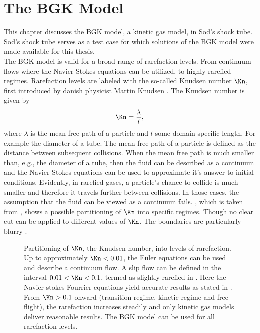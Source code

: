 

\chapter{The BGK Model}
\label{Ch:BGK}

This chapter discusses the BGK model, a kinetic gas model, in Sod's shock tube. Sod's shock tube serves as a test case for which solutions of the BGK model were made available for this thesis.\\
The BGK model is valid for a broad range of rarefaction levels. From continuum flows where the Navier-Stokes equations can be utilized, to highly rarefied regimes. Rarefaction levels are labeled with the so-called Knudsen number \(\Kn\), first introduced by danish physicist Martin Knudsen \cite{Bernard}. The Knudsen number is given by
\begin{equation}
	\Kn = \frac{\lambda}{l}, 
\end{equation}
where \(\lambda\) is the mean free path of a particle and \(l\) some domain specific length. For example the diameter of a tube. The mean free path of a particle is defined as the distance between subsequent collisions. When the mean free path is much smaller than, e.g., the diameter of a tube, then the fluid can be described as a continuum and the Navier-Stokes equations can be used to approximate it's answer to initial conditions. Evidently, in rarefied gases, a particle's chance to collide is much smaller and therefore it travels further between collisions. In those cases, the assumption that the fluid can be viewed as a continuum fails. , which is taken from \cite{NumaKUL}, shows a possible partitioning of \(\Kn\) into specific regimes. Though no clear cut can be applied to different values of \(\Kn\). The boundaries are particularly blurry \cite{schaaf}.
\begin{figure}[H]
	
	\caption{Partitioning of \(\Kn\), the Knudsen number, into levels of rarefaction. Up to approximately \(\Kn < 0.01\), the Euler equations can be used and describe a continuum flow. A slip flow can be defined in the interval \(0.01 < \Kn < 0.1\), termed as slightly rarefied in \cite{schaaf}. Here the Navier-stokes-Fourrier equations yield accurate results as stated in \cite{NumaKUL}. From \(\Kn > 0.1\) onward (transition regime, kinetic regime and free flight), the rarefaction increases steadily and only kinetic gas models deliver reasonable results. The BGK model can be used for all rarefaction levels.}
	\label{Fig:ExpKN}
\end{figure}
